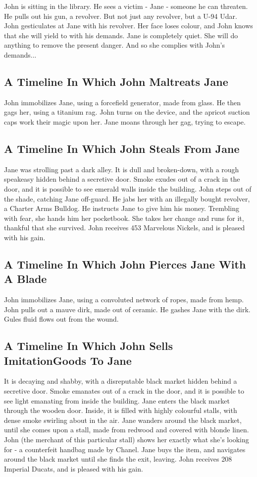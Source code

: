 \documentclass{article}
\begin{document}
John is sitting in the library.
He sees a victim {-} Jane {-} someone he can threaten. He pulls out his gun, a revolver.
But not just any revolver, but a U{-}94 Udar.
John gesticulates at Jane with his revolver. Her face loses colour, and John knows that she will yield to with his demands.
Jane is completely quiet. She will do anything to remove the present danger. And so she complies with John's demands...
\subsection{A Timeline In Which John Maltreats Jane}


John immobilizes Jane, using a forcefield generator, made from glass.
He then gags her, using a titanium rag.
John turns on the device, and the apricot suction caps work their magic upon her.
Jane moans through her gag, trying to escape.
\subsection{A Timeline In Which John Steals From Jane}


Jane was strolling past a dark alley.
It is dull and broken{-}down, with a rough speakeasy hidden behind a secretive door.
Smoke exudes out of a crack in the door, and it is possible to see emerald walls inside the building.
John steps out of the shade, catching Jane off{-}guard.
He jabs her with an illegally bought revolver, a Charter Arms Bulldog.
He instructs Jane to give him his money.
Trembling with fear, she hands him her pocketbook.
She takes her change and runs for it, thankful that she survived.
John receives 453 Marvelous Nickels, and is pleased with his gain.
\subsection{A Timeline In Which John Pierces Jane With A Blade}


John immobilizes Jane, using a convoluted network of ropes, made from hemp.
John pulls out a mauve dirk, made out of ceramic.
He gashes Jane with the dirk.
Gules fluid flows out from the wound.
\subsection{A Timeline In Which John Sells ImitationGoods To Jane}


It is decaying and shabby, with a disreputable black market hidden behind a secretive door.
Smoke emanates out of a crack in the door, and it is possible to see light emanating from inside the building.
Jane enters the black market through the wooden door.
Inside, it is filled with highly colourful stalls, with dense smoke swirling about in the air.
Jane wanders around the black market, until she comes upon a stall, made from redwood and covered with blonde linen.
John (the merchant of this particular stall) shows her exactly what she's looking for {-} a counterfeit handbag made by Chanel.
Jane buys the item, and navigates around the black market until she finds the exit, leaving.
John receives 208 Imperial Ducats, and is pleased with his gain.
\end{document}
